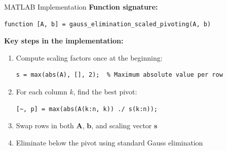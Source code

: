 \documentclass[aspectratio=169]{beamer}
\begin{document}
\begin{frame}[fragile]{MATLAB Implementation}
	\textbf{Function signature:}
	\begin{verbatim}
function [A, b] = gauss_elimination_scaled_pivoting(A, b)
    \end{verbatim}

	\vspace{0.3cm}
	\textbf{Key steps in the implementation:}
	\begin{enumerate}
		\item Compute scaling factors \alert{once} at the beginning:
		      \begin{verbatim}
s = max(abs(A), [], 2);  % Maximum absolute value per row
        \end{verbatim}

		\item For each column $k$, find the best pivot:
		      \begin{verbatim}
[~, p] = max(abs(A(k:n, k)) ./ s(k:n));
        \end{verbatim}

		\item Swap rows in both $\mathbf{A}$, $\mathbf{b}$, and scaling vector $\mathbf{s}$

		\item Eliminate below the pivot using standard Gauss elimination
	\end{enumerate}
\end{frame}
\end{document}

